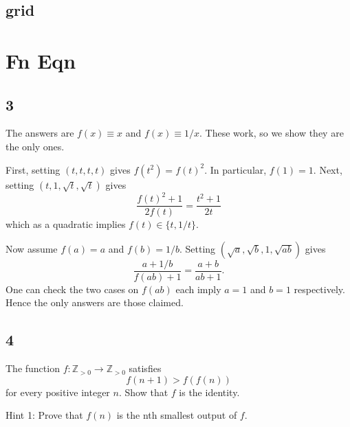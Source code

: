 \documentclass[11pt,twoside]{scrartcl}
\begin{document}
\subsection{grid}
\begin{center}
\end{center}

\section*{Fn Eqn}
\subsection{3}
The answers are $f(x) \equiv x$ and $f(x) \equiv 1/x$.
These work, so we show they are the only ones.

First, setting $(t,t,t,t)$ gives $f(t^2) = f(t)^2$.
In particular, $f(1) = 1$.
Next, setting $(t, 1, \sqrt t, \sqrt t)$ gives
\[ \frac{f(t)^2 + 1}{2f(t)} = \frac{t^2 + 1}{2t} \]
which as a quadratic implies $f(t) \in \{t, 1/t\}$.

Now assume $f(a) = a$ and $f(b) = 1/b$.
Setting $(\sqrt a, \sqrt b, 1, \sqrt{ab})$ gives
\[ \frac{a + 1/b}{f(ab) + 1} = \frac{a+b}{ab+1}. \]
One can check the two cases on $f(ab)$ each imply
$a=1$ and $b=1$ respectively.
Hence the only answers are those claimed.

\subsection{4}
The function  $f \colon {\mathbb Z}_{>0} \to {\mathbb Z}_{>0}$ satisfies
\[f(n+1) > f(f(n))\]
for every positive integer $n$. Show that $f$ is the identity.

Hint 1: Prove that $f(n)$ is the nth smallest output of $f$.
\end{document}
